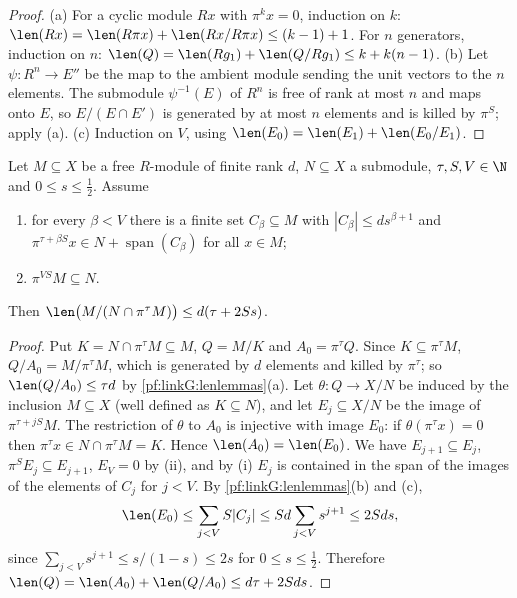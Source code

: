 \begin{proof}
(a) For a cyclic module $Rx$ with $\pi^kx=0$, induction on $k$: $\len(Rx)=\len(R\pi x)+\len(Rx/R\pi x)\le(k-1)+1$. For
$n$ generators, induction on $n$: $\len(Q)=\len(Rg_1)+\len(Q/Rg_1)\le k+k(n-1)$. (b) Let $\psi:R^n\to E''$ be the map to
the ambient module sending the unit vectors to the $n$ elements. The submodule $\psi^{-1}(E)$ of $R^n$ is free of rank
at most $n$ and maps onto $E$, so $E/(E\cap E')$ is generated by at most $n$ elements and is killed by $\pi^S$; apply
(a). (c) Induction on $V$, using $\len(E_0)=\len(E_1)+\len(E_0/E_1)$.
\end{proof}

\begin{lemma}\label{pf:linkG:lengthpart2}
Let $M\subseteq X$ be a free $R$-module of finite rank $d$, $N\subseteq X$ a submodule, $\tau,S,V\in\N$ and $0\le s\le
\frac12$. Assume
\begin{enumerate}[label=(\roman*)]
\item for every $\beta<V$ there is a finite set $C_\beta\subseteq M$ with $|C_\beta|\le ds^{\beta+1}$ and
$\pi^{\tau+\beta S}x\in N+\operatorname{span}(C_\beta)$ for all $x\in M$;
\item $\pi^{VS}M\subseteq N$.
\end{enumerate}
Then $\len\bigl(M/(N\cap\pi^\tau M)\bigr)\le d(\tau+2Ss)$.
\end{lemma}

\begin{proof}
Put $K=N\cap\pi^\tau M\subseteq M$, $Q=M/K$ and $A_0=\pi^\tau Q$. Since $K\subseteq\pi^\tau M$, $Q/A_0=M/\pi^\tau M$, which
is generated by $d$ elements and killed by $\pi^\tau$; so $\len(Q/A_0)\le\tau d$ by \cref{pf:linkG:lenlemmas}(a).
Let $\theta:Q\to X/N$ be induced by the inclusion $M\subseteq X$ (well defined as $K\subseteq N$), and let
$E_j\subseteq X/N$ be the image of $\pi^{\tau+jS}M$. The restriction of $\theta$ to $A_0$ is injective with image $E_0$:
if $\theta(\pi^\tau x)=0$ then $\pi^\tau x\in N\cap\pi^\tau M=K$. Hence $\len(A_0)=\len(E_0)$. We have
$E_{j+1}\subseteq E_j$, $\pi^SE_j\subseteq E_{j+1}$, $E_V=0$ by (ii), and by (i) $E_j$ is contained in the span of the
images of the elements of $C_j$ for $j<V$. By \cref{pf:linkG:lenlemmas}(b) and (c),
\[
\len(E_0)\le\sum_{j<V}S|C_j|\le Sd\sum_{j<V}s^{j+1}\le2Sds,
\]
since $\sum_{j<V}s^{j+1}\le s/(1-s)\le2s$ for $0\le s\le\frac12$. Therefore $\len(Q)=\len(A_0)+\len(Q/A_0)\le
d\tau+2Sds$.
\end{proof}

